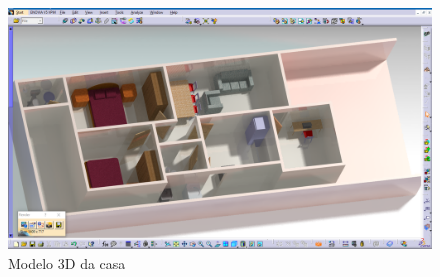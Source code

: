 \begin{figure}[!h]
\caption{Modelo 3D da casa}
\includegraphics[width=\textwidth]{figuras/modelo3D}
\end{figure}

\FloatBarrier
